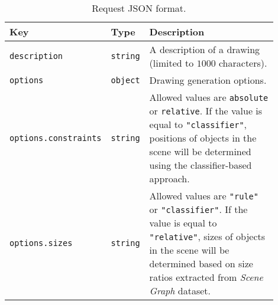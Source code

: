 \begin{table}[ht]
    \small
    \centering
    \begin{tabular}{p{0.3\linewidth}|p{0.1\linewidth}|p{0.5\linewidth}}
        \textbf{Key} & \textbf{Type} & \textbf{Description} \\
        \hline \hline
        \verb|description| & \verb|string| & A description of a drawing (limited to $1000$ characters). \\
        \hline
        \verb|options| & \verb|object| & Drawing generation options. \\
        \hline
        \verb|options.constraints| & \verb|string| & Allowed values are \verb|absolute| or \verb|relative|. If the value is equal to \verb|"classifier"|, positions of objects in the scene will be determined using the classifier-based approach. \\
        \hline
        \verb|options.sizes| & \verb|string| & Allowed values are \verb|"rule"| or \verb|"classifier"|. If the value is equal to \verb|"relative"|, sizes of objects in the scene will be determined based on size ratios extracted from \emph{Scene Graph} dataset. \\
    \end{tabular}
    \caption[Request JSON format]{Request JSON format.}
    \label{tab:api_request}
\end{table}